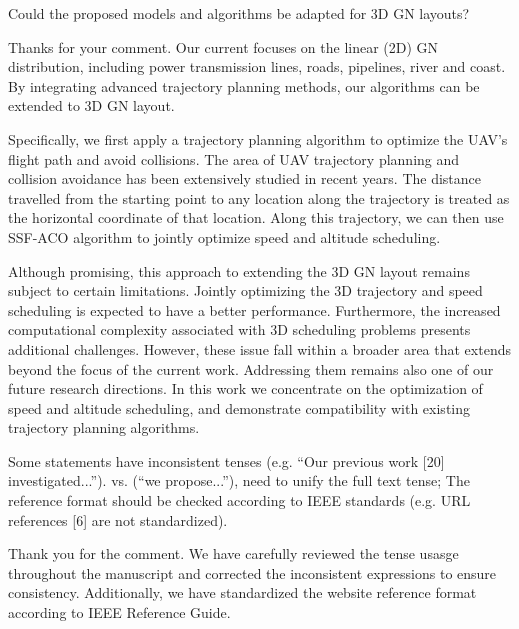 \begin{revcomment}
	Could the proposed models and algorithms be adapted for 3D GN layouts?
\end{revcomment}
\begin{revresponse}
	Thanks for your comment.
	Our current focuses on the linear (2D) GN distribution, including power transmission lines, roads, pipelines, river and coast. By integrating advanced trajectory planning methods, our algorithms can be extended to 3D GN layout.

	Specifically, we first apply a trajectory planning algorithm to optimize the UAV's flight path and avoid collisions.
	The area of UAV trajectory planning and collision avoidance has been extensively studied in recent years.
	The distance travelled from the starting point to any location along the trajectory is treated as the horizontal coordinate of that location.
	Along this trajectory, we can then use SSF-ACO algorithm to jointly optimize speed and altitude scheduling.
	
	Although promising, this approach to extending the 3D GN layout remains subject to certain limitations.
	Jointly optimizing the 3D trajectory and speed scheduling is expected to have a better performance.
	Furthermore, the increased computational complexity associated with 3D scheduling problems presents additional challenges.
	However, these issue fall within a broader area that extends beyond the focus of the current work.
	Addressing them remains also one of our future research directions.
	In this work we concentrate on the optimization of speed and altitude scheduling, and demonstrate compatibility with existing trajectory planning algorithms.
\end{revresponse}

\begin{revcomment}
	Some statements have inconsistent tenses (e.g. ``Our previous work [20] investigated...''). vs. (``we propose...''), need to unify the full text tense; The reference format should be checked according to IEEE standards (e.g. URL references [6] are not standardized).
\end{revcomment}
\begin{revresponse}
	Thank you for the comment.
	We have carefully reviewed the tense usasge throughout the manuscript and corrected the inconsistent expressions to ensure consistency. Additionally, we have standardized the website reference format according to IEEE Reference Guide.
\end{revresponse}

